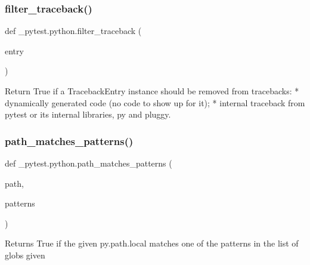 \subsubsection{\texorpdfstring{filter\+\_\+traceback()}{filter\_traceback()}}
{\footnotesize\ttfamily def \+\_\+pytest.\+python.\+filter\+\_\+traceback (\begin{DoxyParamCaption}\item[{}]{entry }\end{DoxyParamCaption})}

\begin{DoxyVerb}Return True if a TracebackEntry instance should be removed from tracebacks:
* dynamically generated code (no code to show up for it);
* internal traceback from pytest or its internal libraries, py and pluggy.
\end{DoxyVerb}
 \mbox{\label{namespace__pytest_1_1python_a624ad6ac9982dd401d284b5b893e1674}} 
\subsubsection{\texorpdfstring{path\+\_\+matches\+\_\+patterns()}{path\_matches\_patterns()}}
{\footnotesize\ttfamily def \+\_\+pytest.\+python.\+path\+\_\+matches\+\_\+patterns (\begin{DoxyParamCaption}\item[{}]{path,  }\item[{}]{patterns }\end{DoxyParamCaption})}

\begin{DoxyVerb}Returns True if the given py.path.local matches one of the patterns in the list of globs given\end{DoxyVerb}
 